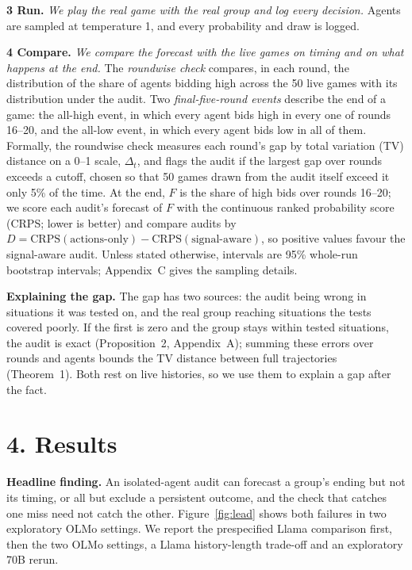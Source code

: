 \documentclass[11pt,letterpaper]{article}
\begin{document}
\textbf{3 Run.}
\emph{We play the real game with the real group and log every decision.}
Agents are sampled at temperature 1, and every probability and draw is logged.

\textbf{4 Compare.}
\emph{We compare the forecast with the live games on timing and on what happens at the end.}
The \emph{roundwise check} compares, in each round, the distribution of the share of agents bidding high across the 50 live games with its distribution under the audit.
Two \emph{final-five-round events} describe the end of a game: the all-high event, in which every agent bids high in every one of rounds 16--20, and the all-low event, in which every agent bids low in all of them.
Formally, the roundwise check measures each round's gap by total variation (TV) distance on a 0--1 scale, $\Delta_t$, and flags the audit if the largest gap over rounds exceeds a cutoff, chosen so that 50 games drawn from the audit itself exceed it only 5\% of the time.
At the end, $F$ is the share of high bids over rounds 16--20; we score each audit's forecast of $F$ with the continuous ranked probability score (CRPS; lower is better) and compare audits by $D = \mathrm{CRPS}(\text{actions-only}) - \mathrm{CRPS}(\text{signal-aware})$, so positive values favour the signal-aware audit.
Unless stated otherwise, intervals are 95\% whole-run bootstrap intervals; Appendix~C gives the sampling details.

\textbf{Explaining the gap.}
The gap has two sources: the audit being wrong in situations it was tested on, and the real group reaching situations the tests covered poorly.
If the first is zero and the group stays within tested situations, the audit is exact (Proposition~2, Appendix~A); summing these errors over rounds and agents bounds the TV distance between full trajectories (Theorem~1).
Both rest on live histories, so we use them to explain a gap after the fact.

\needspace{0.5\textheight}
\section{4. Results}

\textbf{Headline finding.}
An isolated-agent audit can forecast a group's ending but not its timing, or all but exclude a persistent outcome, and the check that catches one miss need not catch the other.
Figure~\ref{fig:lead} shows both failures in two exploratory OLMo settings.
We report the prespecified Llama comparison first, then the two OLMo settings, a Llama history-length trade-off and an exploratory 70B rerun.
\end{document}
